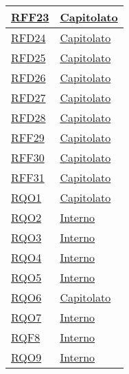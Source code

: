 \begin{longtable}{|>{\centering}m{5cm}|m{5cm}<{\centering}|}
\hyperlink{RFF23}{RFF23} & \hyperlink{Capitolato}{Capitolato}\\ \hline

\hyperlink{RFD24}{RFD24} & \hyperlink{Capitolato}{Capitolato}\\ \hline

\hyperlink{RFD25}{RFD25} & \hyperlink{Capitolato}{Capitolato}\\ \hline

\hyperlink{RFD26}{RFD26} & \hyperlink{Capitolato}{Capitolato}\\ \hline

\hyperlink{RFD27}{RFD27} & \hyperlink{Capitolato}{Capitolato}\\ \hline

\hyperlink{RFD28}{RFD28} & \hyperlink{Capitolato}{Capitolato}\\ \hline

\hyperlink{RFF29}{RFF29} & \hyperlink{Capitolato}{Capitolato}\\ \hline

\hyperlink{RFF30}{RFF30} & \hyperlink{Capitolato}{Capitolato}\\ \hline

\hyperlink{RFF31}{RFF31} & \hyperlink{Capitolato}{Capitolato}\\ \hline

\hyperlink{RQO1}{RQO1} & \hyperlink{Capitolato}{Capitolato}\\ \hline

\hyperlink{RQO2}{RQO2} & \hyperlink{Interno}{Interno}\\ \hline

\hyperlink{RQO3}{RQO3} & \hyperlink{Interno}{Interno}\\ \hline

\hyperlink{RQO4}{RQO4} & \hyperlink{Interno}{Interno}\\ \hline

\hyperlink{RQO5}{RQO5} & \hyperlink{Interno}{Interno}\\ \hline

\hyperlink{RQO6}{RQO6} & \hyperlink{Capitolato}{Capitolato}\\ \hline

\hyperlink{RQO7}{RQO7} & \hyperlink{Interno}{Interno}\\ \hline

\hyperlink{RQF8}{RQF8} & \hyperlink{Interno}{Interno}\\ \hline

\hyperlink{RQO9}{RQO9} & \hyperlink{Interno}{Interno}\\ \hline


\end{longtable}
